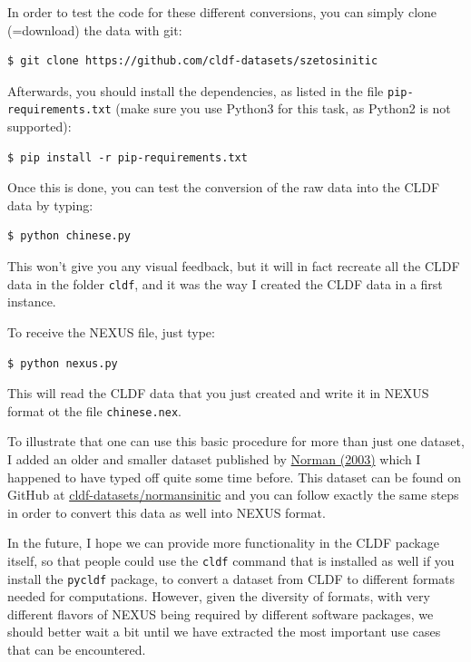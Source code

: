 \documentclass[
  english,
  a4paper,
  oneside,tablecaptionabove
]{scrbook}
\newcommand{\passthrough}[1]{#1}
\begin{document}
In order to test the code for these different conversions, you can
simply clone (=download) the data with git:

\begin{lstlisting}
$ git clone https://github.com/cldf-datasets/szetosinitic
\end{lstlisting}

Afterwards, you should install the dependencies, as listed in the file
\passthrough{\lstinline!pip-requirements.txt!} (make sure you use
Python3 for this task, as Python2 is not supported):

\begin{lstlisting}
$ pip install -r pip-requirements.txt
\end{lstlisting}

Once this is done, you can test the conversion of the raw data into the
CLDF data by typing:

\begin{lstlisting}
$ python chinese.py
\end{lstlisting}

This won't give you any visual feedback, but it will in fact recreate
all the CLDF data in the folder \passthrough{\lstinline!cldf!}, and it
was the way I created the CLDF data in a first instance.

To receive the NEXUS file, just type:

\begin{lstlisting}
$ python nexus.py
\end{lstlisting}

This will read the CLDF data that you just created and write it in NEXUS
format ot the file \passthrough{\lstinline!chinese.nex!}.

To illustrate that one can use this basic procedure for more than just
one dataset, I added an older and smaller dataset published by
\href{http://bibliography.lingpy.org?key=Normal2003}{Norman (2003)}
which I happened to have typed off quite some time before. This dataset
can be found on GitHub at
\href{https://github.com/cldf-datasets/normansinitic}{cldf-datasets/normansinitic}
and you can follow exactly the same steps in order to convert this data
as well into NEXUS format.

In the future, I hope we can provide more functionality in the CLDF
package itself, so that people could use the
\passthrough{\lstinline!cldf!} command that is installed as well if you
install the \passthrough{\lstinline!pycldf!} package, to convert a
dataset from CLDF to different formats needed for computations. However,
given the diversity of formats, with very different flavors of NEXUS
being required by different software packages, we should better wait a
bit until we have extracted the most important use cases that can be
encountered.
\end{document}
